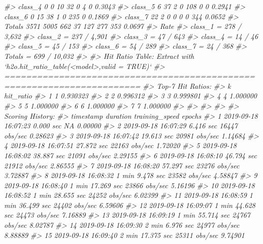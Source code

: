 \documentclass[]{book}
\newenvironment{Shaded}{\begin{snugshade}}{\end{snugshade}}
\newcommand{\CommentTok}[1]{\textcolor[rgb]{0.56,0.35,0.01}{\textit{#1}}}
\begin{document}
\begin{Shaded}
\begin{Highlighting}[]
{{{{\CommentTok{#> class_4       0       0      10      32       0       4       0 0.3043}
\CommentTok{#> class_5       6      37       2       0     108       0       0 0.2941}
\CommentTok{#> class_6       0      15      38       1       0     235       0 0.1869}
\CommentTok{#> class_7      22       2       0       0       0       0     344 0.0652}
\CommentTok{#> Totals     3571    5005     662      37     127     277     353 0.0697}
\CommentTok{#>                   Rate}
\CommentTok{#> class_1 =  278 / 3,632}
\CommentTok{#> class_2 =  237 / 4,901}
\CommentTok{#> class_3 =     47 / 643}
\CommentTok{#> class_4 =      14 / 46}
\CommentTok{#> class_5 =     45 / 153}
\CommentTok{#> class_6 =     54 / 289}
\CommentTok{#> class_7 =     24 / 368}
\CommentTok{#> Totals  = 699 / 10,032}
\CommentTok{#> }
\CommentTok{#> Hit Ratio Table: Extract with `h2o.hit_ratio_table(<model>,valid = TRUE)`}
\CommentTok{#> =======================================================================}
\CommentTok{#> Top-7 Hit Ratios: }
\CommentTok{#>   k hit_ratio}
\CommentTok{#> 1 1  0.930323}
\CommentTok{#> 2 2  0.996312}
\CommentTok{#> 3 3  0.999801}
\CommentTok{#> 4 4  1.000000}
\CommentTok{#> 5 5  1.000000}
\CommentTok{#> 6 6  1.000000}
\CommentTok{#> 7 7  1.000000}
\CommentTok{#> }
\CommentTok{#> }
\CommentTok{#> }
\CommentTok{#> }
\CommentTok{#> Scoring History: }
\CommentTok{#>              timestamp          duration training_speed   epochs}
\CommentTok{#> 1  2019-09-18 16:07:23         0.000 sec             NA  0.00000}
\CommentTok{#> 2  2019-09-18 16:07:29         6.416 sec  16447 obs/sec  0.28623}
\CommentTok{#> 3  2019-09-18 16:07:42        19.613 sec  20981 obs/sec  1.14684}
\CommentTok{#> 4  2019-09-18 16:07:51        27.872 sec  22163 obs/sec  1.72020}
\CommentTok{#> 5  2019-09-18 16:08:02        38.887 sec  21091 obs/sec  2.29155}
\CommentTok{#> 6  2019-09-18 16:08:10        46.794 sec  21912 obs/sec  2.86555}
\CommentTok{#> 7  2019-09-18 16:08:20        57.297 sec  23276 obs/sec  3.72887}
\CommentTok{#> 8  2019-09-18 16:08:32  1 min  9.478 sec  23582 obs/sec  4.58847}
\CommentTok{#> 9  2019-09-18 16:08:40  1 min 17.269 sec  23866 obs/sec  5.16196}
\CommentTok{#> 10 2019-09-18 16:08:52  1 min 28.655 sec  24252 obs/sec  6.02399}
\CommentTok{#> 11 2019-09-18 16:08:59  1 min 36.499 sec  24402 obs/sec  6.59606}
\CommentTok{#> 12 2019-09-18 16:09:07  1 min 44.628 sec  24473 obs/sec  7.16889}
\CommentTok{#> 13 2019-09-18 16:09:19  1 min 55.714 sec  24767 obs/sec  8.02787}
\CommentTok{#> 14 2019-09-18 16:09:30  2 min  6.976 sec  24977 obs/sec  8.88889}
\CommentTok{#> 15 2019-09-18 16:09:40  2 min 17.375 sec  25311 obs/sec  9.74901}
}}}}
\end{Highlighting}
\end{Shaded}
\end{document}
